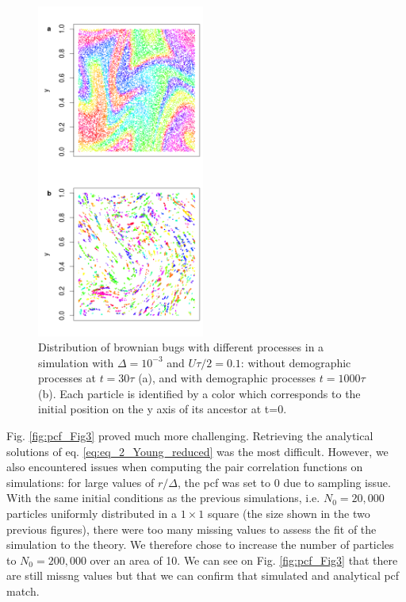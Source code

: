 \begin{figure}[H]
\begin{center}
\includegraphics[width=0.49\textwidth]{../code/figure/spatial_distribution_Fig2.png}
  \caption{Distribution of brownian bugs with different processes in a simulation with $\Delta=10^{-3}$ and $U\tau/2=0.1$: without demographic processes at $t=30\tau$ (a), and with demographic processes $t=1000\tau$ (b). Each particle is identified by a color which corresponds to the initial position on the y axis of its ancestor at t=0.}
  \label{fig:spatial_fig2}
\end{center}
  \end{figure}
  
Fig. \ref{fig:pcf_Fig3} proved much more challenging. Retrieving the analytical solutions of eq. \ref{eq:eq_2_Young_reduced} was the most difficult. However, we also encountered issues when computing the pair correlation functions on simulations: for large values of $r/\Delta$, the pcf was set to 0 due to sampling issue. With the same initial conditions as the previous simulations, i.e.  $N_0=20,000$ particles uniformly distributed in a $1\times 1$ square (the size shown in the two previous figures), there were too many missing values to assess the fit of the simulation to the theory. We therefore chose to increase the number of particles to $N_0=200,000$ over an area of 10. We can see on Fig. \ref{fig:pcf_Fig3} that there are still missng values but that we can confirm that simulated and analytical pcf match. 

